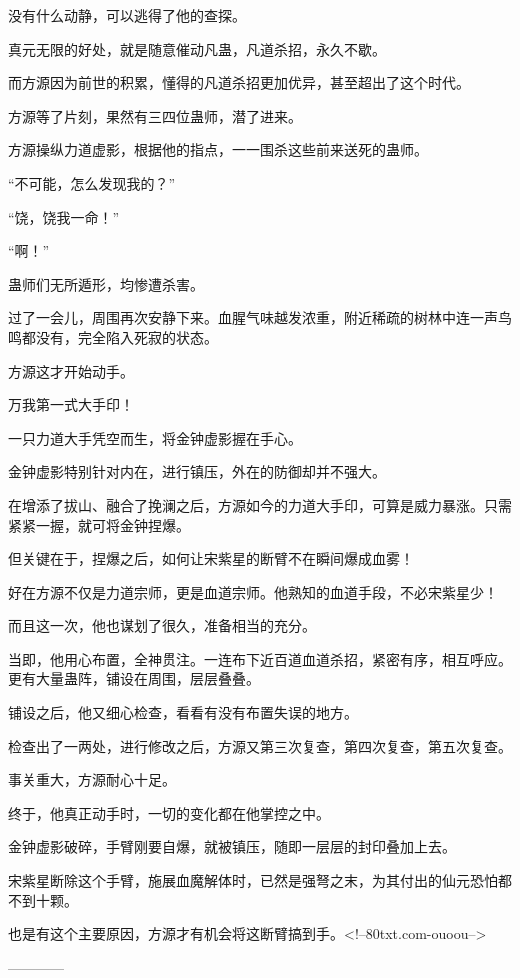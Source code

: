 \begin{this_body}
没有什么动静，可以逃得了他的查探。

真元无限的好处，就是随意催动凡蛊，凡道杀招，永久不歇。

而方源因为前世的积累，懂得的凡道杀招更加优异，甚至超出了这个时代。

方源等了片刻，果然有三四位蛊师，潜了进来。

方源操纵力道虚影，根据他的指点，一一围杀这些前来送死的蛊师。

“不可能，怎么发现我的？”

“饶，饶我一命！”

“啊！”

蛊师们无所遁形，均惨遭杀害。

过了一会儿，周围再次安静下来。血腥气味越发浓重，附近稀疏的树林中连一声鸟鸣都没有，完全陷入死寂的状态。

方源这才开始动手。

万我第一式大手印！

一只力道大手凭空而生，将金钟虚影握在手心。

金钟虚影特别针对内在，进行镇压，外在的防御却并不强大。

在增添了拔山、融合了挽澜之后，方源如今的力道大手印，可算是威力暴涨。只需紧紧一握，就可将金钟捏爆。

但关键在于，捏爆之后，如何让宋紫星的断臂不在瞬间爆成血雾！

好在方源不仅是力道宗师，更是血道宗师。他熟知的血道手段，不必宋紫星少！

而且这一次，他也谋划了很久，准备相当的充分。

当即，他用心布置，全神贯注。一连布下近百道血道杀招，紧密有序，相互呼应。更有大量蛊阵，铺设在周围，层层叠叠。

铺设之后，他又细心检查，看看有没有布置失误的地方。

检查出了一两处，进行修改之后，方源又第三次复查，第四次复查，第五次复查。

事关重大，方源耐心十足。

终于，他真正动手时，一切的变化都在他掌控之中。

金钟虚影破碎，手臂刚要自爆，就被镇压，随即一层层的封印叠加上去。

宋紫星断除这个手臂，施展血魔解体时，已然是强弩之末，为其付出的仙元恐怕都不到十颗。

也是有这个主要原因，方源才有机会将这断臂搞到手。<!--80txt.com-ouoou-->

------------

\end{this_body}

